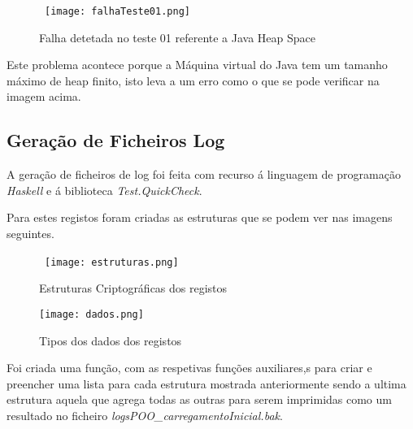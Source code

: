 \begin{figure}[H]

  \centering

  \hbox{\hspace{-8em} \texttt{[image: falhaTeste01.png]}}

  \caption {Falha detetada no teste 01 referente a Java Heap Space}

  \label {fig44}

\end{figure}

\par Este problema acontece porque a Máquina virtual do Java tem um tamanho máximo de heap finito, isto leva a um erro como o que se pode verificar na imagem acima.\newline

\subsection{Geração de Ficheiros Log}

\par A geração de ficheiros de log foi feita com recurso á linguagem de programação \textit{Haskell} e á biblioteca \textit{Test.QuickCheck}.\newline

\par Para estes registos foram criadas as estruturas que se podem ver nas imagens seguintes.\newline

\begin{figure}[H]

  \centering

  \hbox{\hspace{-8em} \texttt{[image: estruturas.png]}}

  \caption {Estruturas Criptográficas dos registos}

  \label {fig45}
\end{figure}
\begin{figure}[H]
  \centering

  \texttt{[image: dados.png]}

  \caption {Tipos dos dados dos registos}

  \label {fig46}
\end{figure}

\par Foi criada uma função, com as respetivas funções auxiliares,s para criar e preencher uma lista para cada estrutura mostrada anteriormente sendo a ultima estrutura aquela que agrega todas as outras para serem imprimidas como um resultado no ficheiro \textit{logsPOO\_carregamentoInicial.bak}.\newline
\newpage

